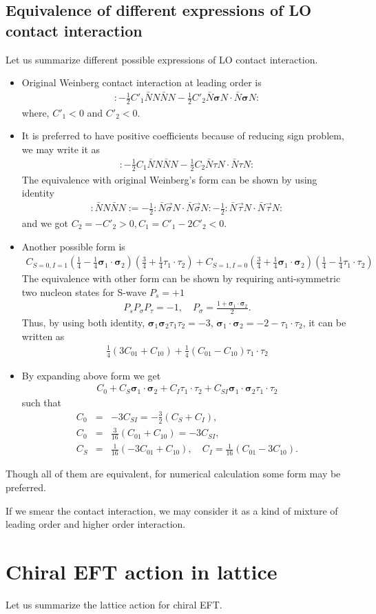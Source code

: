 \documentclass[10pt]{book}
\def\bm{\boldsymbol}
\newcommand{\bea}{\begin{eqnarray}}
\newcommand{\eea}{\end{eqnarray}}
\newcommand{\no}{\nonumber \\}
\def\vs{{\bm \sigma}}
\begin{document}
\subsection{Equivalence of different expressions of LO contact interaction}
Let us summarize different possible expressions of LO contact interaction.
\begin{itemize} 
\item Original Weinberg contact interaction at leading order is
\bea 
:-\frac{1}{2}C'_1\bar{N}N\bar{N}N-\frac{1}{2}C'_2\bar{N}\vs N\cdot\bar{N}\vs N:
\eea 
where, $C'_1<0$ and $C'_2<0$.
\item It is preferred to have positive coefficients because of reducing sign problem,
we may write it as
\bea 
:-\frac{1}{2}C_1\bar{N}N\bar{N}N-\frac{1}{2}C_2\bar{N}\tau N\cdot\bar{N}\tau N:
\eea 
The equivalence with original Weinberg's form can be shown by using identity
\bea 
:\bar{N}N\bar{N}N:=-\frac{1}{2}:\bar{N}{\vec \sigma} N\cdot\bar{N}{\vec \sigma} N:
-\frac{1}{2}:\bar{N}{\vec \tau} N\cdot\bar{N}{\vec \tau} N: 
\eea 
and we got $C_2=-C'_2>0, C_1=C'_1-2 C'_2<0$.
\item Another possible form is
\bea 
C_{S=0,I=1}\left(\frac{1}{4}-\frac{1}{4}\vs_1\cdot\vs_2\right)
      \left(\frac{3}{4}+\frac{1}{4}\tau_1\cdot\tau_2\right) 
+C_{S=1,I=0}\left(\frac{3}{4}+\frac{1}{4}\vs_1\cdot\vs_2\right)
      \left(\frac{1}{4}-\frac{1}{4}\tau_1\cdot\tau_2\right)        
\eea 
The equivalence with other form can be shown by requiring anti-symmetric 
two nucleon states for S-wave $P_s=+1$
\bea 
P_s P_\sigma P_\tau=-1,\quad P_\sigma=\frac{1+\vs_1\cdot\vs_2}{2}.
\eea 
Thus, by using both identity, 
$\vs_1\vs_2\tau_1\tau_2=-3$, $\vs_1\cdot\vs_2=-2-\tau_1\cdot\tau_2$, it 
can be written as
\bea 
\frac{1}{4}(3C_{01}+C_{10})+\frac{1}{4}(C_{01}-C_{10})\tau_1\cdot\tau_2
\eea 
\item By expanding above form we get
\bea 
C_0+C_S \vs_1\cdot\vs_2+C_{I} \tau_1\cdot\tau_2 +C_{SI}\vs_1\cdot\vs_2\tau_1\cdot\tau_2
\eea 
such that
\bea 
C_0&=&-3C_{SI}=-\frac{3}{2}(C_S+C_I), \no 
C_0&=& \frac{3}{16}(C_{01}+C_{10})=-3C_{SI},\no 
C_{S}&=&\frac{1}{16}(-3C_{01}+C_{10}),\quad C_{I}=\frac{1}{16}(C_{01}-3C_{10}).
\eea 
\end{itemize}
Though all of them are equivalent, for numerical calculation some form may be preferred.

If we smear the contact interaction, we may consider it as a kind of mixture of leading order
and higher order interaction. 


\section{Chiral EFT action in lattice}
Let us summarize the lattice action for chiral EFT. 
\end{document}

